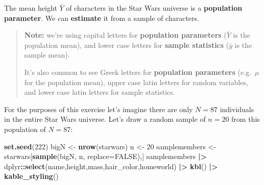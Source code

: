 \documentclass[
]{book}
\newenvironment{Shaded}{\begin{snugshade}}{\end{snugshade}}
\newcommand{\AttributeTok}[1]{\textcolor[rgb]{0.13,0.29,0.53}{#1}}
\newcommand{\ConstantTok}[1]{\textcolor[rgb]{0.56,0.35,0.01}{#1}}
\newcommand{\DecValTok}[1]{\textcolor[rgb]{0.00,0.00,0.81}{#1}}
\newcommand{\FunctionTok}[1]{\textcolor[rgb]{0.13,0.29,0.53}{\textbf{#1}}}
\newcommand{\NormalTok}[1]{#1}
\newcommand{\OtherTok}[1]{\textcolor[rgb]{0.56,0.35,0.01}{#1}}
\newcommand{\SpecialCharTok}[1]{\textcolor[rgb]{0.81,0.36,0.00}{\textbf{#1}}}
\begin{document}
The mean height \(\bar{Y}\) of characters in the Star Wars universe is a \textbf{population parameter}.
We can \textbf{estimate} it from a sample of characters.

\begin{quote}
\textbf{Note:} we're using capital letters for \textbf{population parameters}
(\(\bar{Y}\) is the population mean), and lower case letters for \textbf{sample statistics}
(\(\bar{y}\) is the sample mean).

It's also common to see Greek letters for \textbf{population parameters} (e.g.~\(\mu\) for the
population mean), upper case latin letters for random variables, and lower case latin letters
for sample statistics.
\end{quote}

For the purposes of this exercise let's imagine there are only \(N=87\) individuals in the entire
Star Wars universe. Let's draw a random sample of \(n=20\) from this population of \(N=87\):

\begin{Shaded}
\begin{Highlighting}[]
\FunctionTok{set.seed}\NormalTok{(}\DecValTok{222}\NormalTok{)}
\NormalTok{bigN }\OtherTok{\textless{}{-}} \FunctionTok{nrow}\NormalTok{(starwars)}
\NormalTok{n }\OtherTok{\textless{}{-}} \DecValTok{20}
\NormalTok{samplemembers }\OtherTok{\textless{}{-}}\NormalTok{ starwars[}\FunctionTok{sample}\NormalTok{(bigN, n, }\AttributeTok{replace=}\ConstantTok{FALSE}\NormalTok{),]}
\NormalTok{samplemembers }\SpecialCharTok{|\textgreater{}}
\NormalTok{  dplyr}\SpecialCharTok{::}\FunctionTok{select}\NormalTok{(name,height,mass,hair\_color,homeworld) }\SpecialCharTok{|\textgreater{}}
  \FunctionTok{kbl}\NormalTok{() }\SpecialCharTok{|\textgreater{}}
  \FunctionTok{kable\_styling}\NormalTok{()}
\end{Highlighting}
\end{Shaded}
\end{document}
